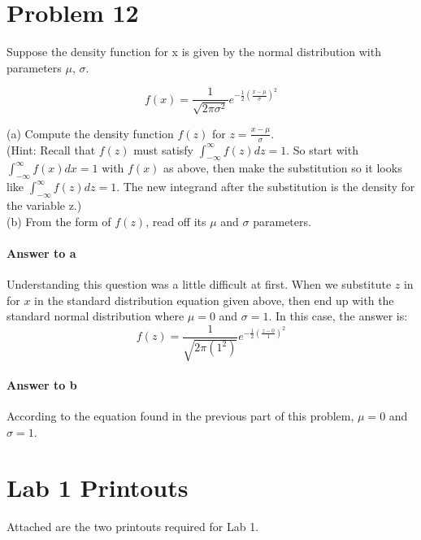 \documentclass{article}
\begin{document}
\clearpage
\section*{Problem 12}
	
	Suppose the density function for x is given by the normal distribution with parameters $\mu$, 
	$\sigma$.
	
	\begin{displaymath}
		f(x) = \frac{1}{\sqrt{2\pi\sigma^2}} e^{-\frac{1}{2}\left(\frac{x - \mu}{\sigma}\right)^2}
	\end{displaymath}
	
	\noindent (a) Compute the density function $ f(z) $ for $ z = \frac{x - \mu}{\sigma} $. \\

	\noindent (Hint: Recall that $ f(z) $ must satisfy $\int_{-\infty}^{\infty} f(z) dz = 1$. So start with 
	$\int_{-\infty}^{\infty} f(x) dx = 1 $ with $ f(x) $ as above, then make the substitution so it looks
	like $\int_{-\infty}^{\infty} f(z) dz = 1$. The new integrand after the substitution is the density for 
	the variable z.) \\

	\noindent (b) From the form of $f(z)$, read off its $\mu$ and $\sigma$ parameters.
	
	\paragraph{Answer to a}
	Understanding this question was a little difficult at first. When we substitute $z$ in for $x$ in the 
	standard distribution equation given above, then end up with the standard normal distribution 
	where $\mu = 0$ and $\sigma = 1$. In this case, the answer is:
	\begin{displaymath}
		f(z) = \frac{1}{\sqrt{2\pi (1^2)}} e^{-\frac{1}{2}\left(\frac{z - 0}{1}\right)^2}
	\end{displaymath}
	
	\paragraph{Answer to b}
	According to the equation found in the previous part of this problem, $\mu = 0$ and $\sigma = 
	1$.
	
\vspace{5.0\baselineskip}
\section*{Lab 1 Printouts}

Attached are the two printouts required for Lab 1.

\clearpage


	
\end{document}
